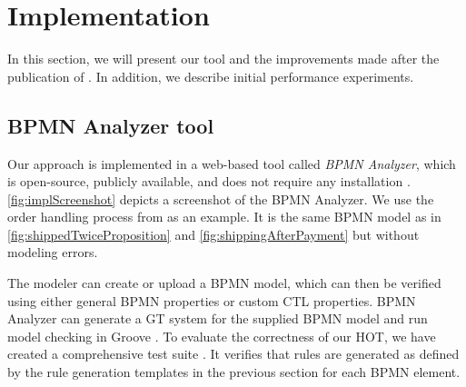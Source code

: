 \documentclass{lmcs} %
\begin{document}
\section{Implementation} \label{sec:impl}
In this section, we will present our tool and the improvements made after the publication of \cite{krauterFormalizationAnalysisBPMN2023}.
In addition, we describe initial performance experiments.

\subsection{BPMN Analyzer tool}

Our approach is implemented in a web-based tool called \textit{BPMN Analyzer}, which is open-source, publicly available, and does not require any installation \cite{timkrauterLMCS2024Artifacts2023, krauterFormalizationAnalysisBPMN2023}.
\autoref{fig:implScreenshot} depicts a screenshot of the BPMN Analyzer.
We use the order handling process from \cite{ruckerPracticalProcessAutomation2021} as an example.
It is the same BPMN model as in \autoref{fig:shippedTwiceProposition} and \autoref{fig:shippingAfterPayment} but without modeling errors.

The modeler can create or upload a BPMN model, which can then be verified using either general BPMN properties or custom CTL properties.
BPMN Analyzer can generate a GT system for the supplied BPMN model and run model checking in Groove \cite{kastenbergModelCheckingDynamic2006}. 
To evaluate the correctness of our HOT, we have created a comprehensive test suite \cite{timkrauterLMCS2024Artifacts2023}.
It verifies that rules are generated as defined by the rule generation templates in the previous section for each BPMN element.
\end{document}
